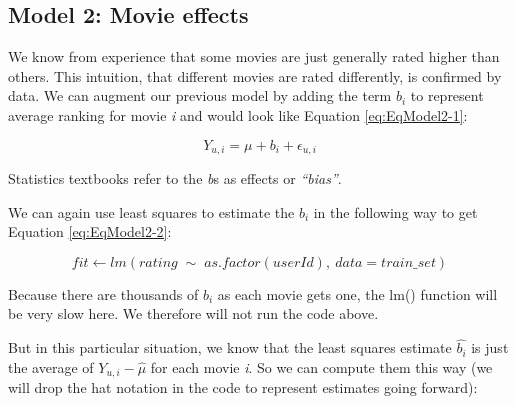 \documentclass[
]{article}
\newenvironment{Shaded}{}{}
\newcommand{\AttributeTok}[1]{\textcolor[rgb]{0.49,0.56,0.16}{#1}}
\newcommand{\FunctionTok}[1]{\textcolor[rgb]{0.02,0.16,0.49}{#1}}
\newcommand{\NormalTok}[1]{#1}
\newcommand{\OtherTok}[1]{\textcolor[rgb]{0.00,0.44,0.13}{#1}}
\newcommand{\SpecialCharTok}[1]{\textcolor[rgb]{0.25,0.44,0.63}{#1}}
\begin{document}
\newpage

\hypertarget{model-2-movie-effects}{%
\subsection{Model 2: Movie effects}\label{model-2-movie-effects}}

We know from experience that some movies are just generally rated higher
than others. This intuition, that different movies are rated
differently, is confirmed by data. We can augment our previous model by
adding the term \(b_{i}\) to represent average ranking for movie
\emph{i} and would look like Equation \ref{eq:EqModel2-1}:

%
\par

\label{eq:EqModel2-1} \begin{equation}
  Y_{u,i} = \mu + b_{i} + \epsilon_{u,i}
\end{equation}

Statistics textbooks refer to the \emph{b}s as effects or
\emph{``bias''}.

We can again use least squares to estimate the \(b_{i}\) in the
following way to get Equation \ref{eq:EqModel2-2}:

%
\par

\label{eq:EqModel2-2} \begin{equation}
  fit \leftarrow lm(rating \; \sim \; as.factor(userId), \: data = train\_{}set)
\end{equation}

Because there are thousands of \(b_{i}\) as each movie gets one, the
lm() function will be very slow here. We therefore will not run the code
above.

But in this particular situation, we know that the least squares
estimate \(\hat{b_{i}}\) is just the average of \(Y_{u,i}-\hat{\mu}\)
for each movie \emph{i}. So we can compute them this way (we will drop
the hat notation in the code to represent estimates going forward):

\begin{Shaded}
\end{Shaded}
\end{document}
